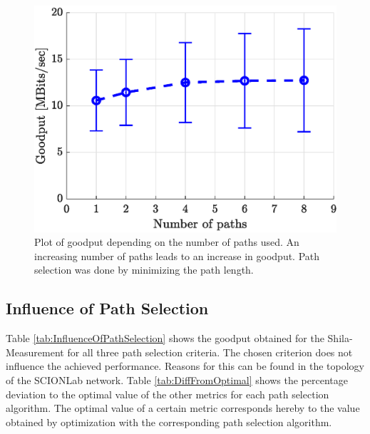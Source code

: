 \begin{figure}
	\begin{center}
		\includegraphics[scale=0.65]{../illustrations/performanceEvaluation/PerformanceWrtPathShortestpath.eps}  
		\caption[]{Plot of goodput depending on the number of paths used. An increasing number of paths leads to an increase in goodput. Path selection was done by minimizing the path length.}
		\label{fig:GoodputWrtToNOfPathsForShortestPath}
	\end{center}
\end{figure}

\subsection*{Influence of Path Selection}
\label{subsec:InfluencePathSelection}

Table \ref{tab:InfluenceOfPathSelection} shows the goodput obtained for the Shila-Measurement for all three path selection criteria. The chosen criterion does not influence the achieved performance. Reasons for this can be found in the topology of the SCIONLab network. Table \ref{tab:DiffFromOptimal}  shows the percentage deviation to the optimal value of the other metrics for each path selection algorithm. The optimal value of a certain metric corresponds hereby to the value obtained by optimization with the corresponding path selection algorithm. 

